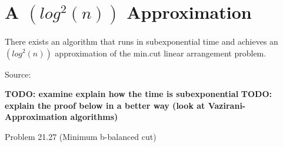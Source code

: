 \section{A $(log^2(n))$ Approximation}

There exists an algorithm that runs in subexponential time and achieves an
$(log^2(n))$ approximation of the min.cut linear arrangement problem. 

Source: \cite{vazi01}

\textbf{TODO: examine explain how the time is subexponential}
\textbf{TODO: explain the proof below in a better way (look at Vazirani-Approximation algorithms)}

Problem 21.27 (Minimum b-balanced cut)	

% 
